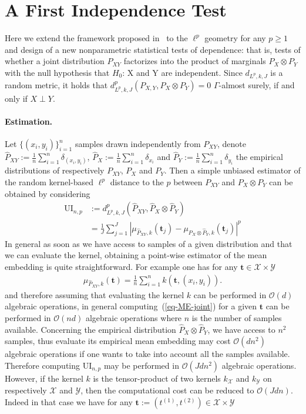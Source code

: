 \section{A First Independence Test}
Here we extend the framework proposed in~\cite{jitkrittum2017adaptive} to the $\ell^p$ geometry for any $p\geq 1$ and design of a new nonparametric statistical tests of dependence: that is, tests of whether a joint distribution $P_{XY}$ factorizes into the product of marginals $P_X\otimes P_Y$ with the null hypothesis that $H_0$: X and Y are independent. Since $d_{L^{p},k,J}$ is a random metric, it holds that
$d_{L^{p},k,J}^p(P_{X,Y},P_X\otimes P_Y)=0$ $\Gamma$-almost surely, if and only if  $X\perp Y$.

\paragraph{Estimation.} Let $\{(x_i,y_i)\}_{i=1}^n$ samples drawn independently from $P_{XY}$, denote $\widehat{P}_{XY}:=\frac{1}{n}\sum_{i=1}^n\delta_{(x_i,y_i)}$, $\widehat{P}_X:=\frac{1}{n}\sum_{i=1}^n\delta_{x_i}$ and $\widehat{P}_Y:=\frac{1}{n}\sum_{i=1}^n\delta_{y_i}$ the empirical distributions of respectively $P_{XY}$, $P_X$ and $P_Y$. Then a simple unbiased estimator of the random kernel-based $\ell^p$ distance to the $p$ between $P_{XY}$ and $P_X\otimes P_Y$ can be obtained by considering 
\begin{align*}
    \text{UI}_{n,p}&:= d_{L^{p},k,J}^p(\widehat{P}_{XY},\widehat{P}_X\otimes\widehat{P}_Y)\\
    &=\frac{1}{J}\sum_{j=1}^J\left|\mu_{\widehat{P}_{XY},k}(\mathbf{t}_j)-\mu_{\widehat{P}_X\otimes\widehat{P}_Y,k}(\mathbf{t}_j)\right|^p
\end{align*}
In general as soon as we have access to samples of a given distribution and that we can evaluate the kernel, obtaining a point-wise estimator of the mean embedding is quite straightforward. For example one has for any $\mathbf{t}\in\mathcal{X}\times\mathcal{Y}$
\begin{align}
\label{eq-ME-joint}
    \mu_{\widehat{P}_{XY},k}(\mathbf{t})=\frac{1}{n}\sum_{i=1}^n k(\mathbf{t},(x_i,y_i)).
\end{align}
and therefore assuming that evaluating the kernel $k$ can be performed in $\mathcal{O}(d)$ algebraic operations, in general computing~(\ref{eq-ME-joint}) for a given $\mathbf{t}$ can be performed in $\mathcal{O}(nd)$ algebraic operations where $n$ is the number of samples available. Concerning the empirical distribution $\widehat{P}_X\otimes \widehat{P}_Y$,  we have access to $n^2$ samples, thus evaluate its empirical mean embedding may cost $\mathcal{O}(dn^2)$ algebraic operations if one wants to take into account all the samples available. Therefore computing $\text{UI}_{n,p}$ may be performed in $\mathcal{O}(Jdn^2)$ algebraic operations. However, if the kernel $k$ is the tensor-product of two kernels $k_{\mathcal{X}}$ and $k_{\mathcal{Y}}$ on respectively $\mathcal{X}$ and $\mathcal{Y}$, then the computational cost can be reduced to $\mathcal{O}(Jdn)$. Indeed in that case we have for any $\mathbf{t}:=(t^{(1)},t^{(2)})\in\mathcal{X}\times\mathcal{Y}$
